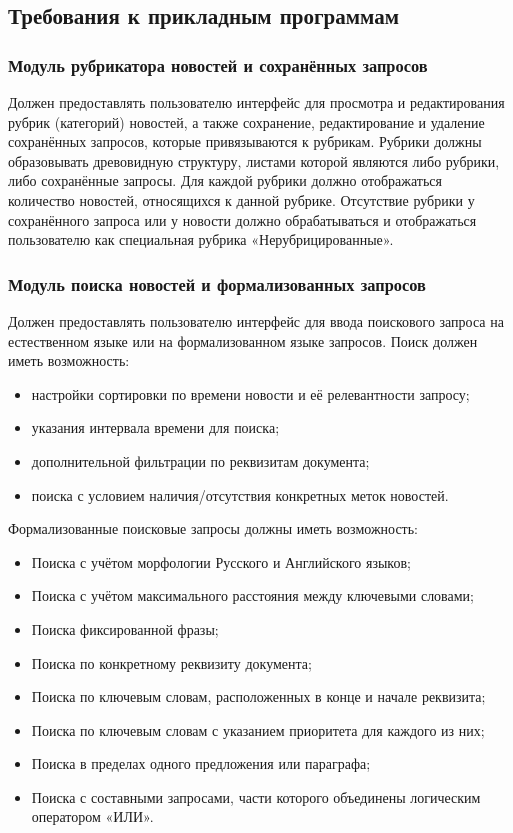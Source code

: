 \documentclass[russian,utf8,emptystyle]{eskdtext}
\begin{document}
\subsection{Требования к прикладным программам}

\subsubsection{Модуль рубрикатора новостей и сохранённых запросов}

Должен предоставлять пользователю интерфейс для просмотра и редактирования рубрик (категорий) новостей, а также сохранение, редактирование и удаление сохранённых запросов, которые привязываются к рубрикам. Рубрики должны образовывать древовидную структуру, листами которой являются либо рубрики, либо сохранённые запросы. Для каждой рубрики должно отображаться количество новостей, относящихся к данной рубрике. Отсутствие рубрики у сохранённого запроса или у новости должно обрабатываться и отображаться пользователю как специальная рубрика «Нерубрицированные». 

\subsubsection{Модуль поиска новостей и формализованных запросов}

Должен предоставлять пользователю интерфейс для ввода поискового запроса на естественном языке или на формализованном языке запросов. Поиск должен иметь возможность:
\begin{itemize}
\item настройки сортировки по времени новости и её релевантности запросу;
\item указания интервала времени для поиска;
\item дополнительной фильтрации по реквизитам документа;
\item поиска с условием наличия/отсутствия конкретных меток новостей.
\end{itemize}

Формализованные поисковые запросы должны иметь возможность:
\begin{itemize}
\item Поиска с учётом морфологии Русского и Английского языков;
\item Поиска с учётом максимального расстояния между ключевыми словами;
\item Поиска фиксированной фразы;
\item Поиска по конкретному реквизиту документа;
\item Поиска по ключевым словам, расположенных в конце и начале реквизита;
\item Поиска по ключевым словам с указанием приоритета для каждого из них;
\item Поиска в пределах одного предложения или параграфа;
\item Поиска с составными запросами, части которого объединены логическим оператором «ИЛИ».
\end{itemize}
\end{document}
